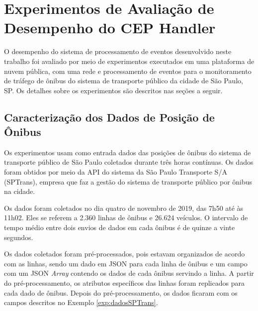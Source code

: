 \chapter{Experimentos de Avaliação de Desempenho do CEP Handler}
\label{cap:experimento}

O desempenho do sistema de processamento de eventos desenvolvido neste trabalho foi avaliado por meio de experimentos executados em uma plataforma de nuvem pública, com uma rede e processamento de eventos para o monitoramento de tráfego de ônibus do sistema de transporte público da cidade de São Paulo, SP. Os detalhes sobre os experimentos são descritos nas seções a seguir.

\section{Caracterização dos Dados de Posição de Ônibus}

Os experimentos usam como entrada dados das posições de ônibus do sistema de transporte público de São Paulo coletados durante três horas contínuas. Os dados foram obtidos por meio da API do sistema \cite{Olhovivo} da São Paulo Transporte S/A (SPTrans), empresa que faz a gestão do sistema de transporte público por ônibus na cidade.

Os dados foram coletados no dia quatro de novembro de 2019, das 7h50 até às 11h02. Eles se referem a 2.360 linhas de ônibus e 26.624 veículos. O intervalo de tempo médio entre dois envios de dados em cada ônibus é de quinze a vinte segundos.

Os dados coletados foram pré-processados, pois estavam organizados de acordo com as linhas, sendo um dado em JSON para cada linha de ônibus e um campo com um JSON \textit{Array} contendo os dados de cada ônibus servindo a linha. A partir do pré-processamento, os atributos específicos das linhas foram replicados para cada dado de ônibus.
Depois do pré-processamento, os dados ficaram com os campos descritos no Exemplo \ref{exp:dadosSPTrans}.

